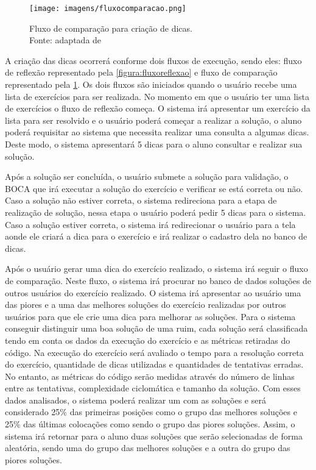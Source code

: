 \begin{figure}[ht]
	\centering
	\captionsetup{justification=centering}
	\texttt{[image: imagens/fluxocomparacao.png]}
	\caption[Fluxo de comparação para criação de dicas]{Fluxo de comparação para criação de dicas. \\ Fonte: adaptada de }
	\label{figura:fluxocomparacao}
\end{figure}

A criação das dicas ocorrerá conforme dois fluxos de execução, sendo eles: fluxo de reflexão representado pela \cref{figura:fluxoreflexao} e fluxo de comparação representado pela \cref{figura:fluxocomparacao}. Os dois fluxos são iniciados quando o usuário recebe uma lista de exercícios para ser realizada. No momento em que o usuário ter uma lista de exercícios o fluxo de reflexão começa. O sistema irá apresentar um exercício da lista para ser resolvido e o usuário poderá começar a realizar a solução, o aluno poderá requisitar ao sistema que necessita realizar uma consulta a algumas dicas. Deste modo, o sistema apresentará 5 dicas para o aluno consultar e realizar sua solução.

Após a solução ser concluída, o usuário submete a solução para validação, o BOCA que irá executar a solução do exercício e verificar se está correta ou não. Caso a solução não estiver correta, o sistema redireciona para a etapa de realização de solução, nessa etapa o usuário poderá pedir 5 dicas para o sistema. Caso a solução estiver correta, o sistema irá redirecionar o usuário para a tela aonde ele criará a dica para o exercício e irá realizar o cadastro dela no banco de dicas.

Após o usuário gerar uma dica do exercício realizado, o sistema irá seguir o fluxo de comparação. Neste fluxo, o sistema irá procurar no banco de dados soluções de outros usuários do exercício realizado. O sistema irá apresentar ao usuário uma das piores e a uma das melhores soluções do exercício realizadas por outros usuários para que ele crie uma dica para melhorar as soluções. Para o sistema conseguir distinguir uma boa solução de uma ruim, cada solução será classificada tendo em conta os dados da execução do exercício e as métricas retiradas do código. Na execução do exercício será avaliado o tempo para a resolução correta do exercício, quantidade de dicas utilizadas e quantidades de tentativas erradas. No entanto, as métricas do código serão medidas através do número de linhas entre as tentativas, complexidade ciclomática e tamanho da solução. Com esses dados analisados, o sistema poderá realizar um  com as soluções e será considerado 25\% das primeiras posições como o grupo das melhores soluções e 25\% das últimas colocações como sendo o grupo das piores soluções. Assim, o sistema irá retornar para o aluno duas soluções que serão selecionadas de forma aleatória, sendo uma do grupo das melhores soluções e a outra do grupo das piores soluções.

